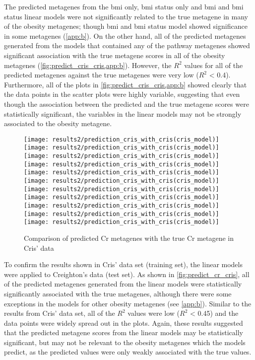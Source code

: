 The predicted metagenes from the \gls{bmi} only, \gls{bmi} status only and \gls{bmi} and \gls{bmi} status linear models were not significantly related to the true metagene in many of the obesity metagenes; though \gls{bmi} and \gls{bmi} status model showed significance in some metagenes (\cref{app:b}).
On the other hand, all of the predicted metagenes generated from the models that contained any of the pathway metagenes showed significant association with the true metagene scores in all of the obesity metagenes (\cref{fig:predict_cris_cris,app:b}).
However, the $R^2$ values for all of the predicted metagenes against the true metagenes were very low ($R^2$ \textless{} 0.4).
Furthermore, all of the plots in \cref{fig:predict_cris_cris,app:b} showed clearly that the data points in the scatter plots were highly variable, suggesting that even though the association between the predicted and the true metagene scores were statistically significant, the variables in the linear models may not be strongly associated to the obesity metagene.

\begin{figure}[htpb]
	\centering
	\texttt{[image: results2/prediction\_cris\_with\_cris(cris\_model)]}
	\texttt{[image: results2/prediction\_cris\_with\_cris(cris\_model)]}
	\texttt{[image: results2/prediction\_cris\_with\_cris(cris\_model)]}
	\texttt{[image: results2/prediction\_cris\_with\_cris(cris\_model)]}
	\texttt{[image: results2/prediction\_cris\_with\_cris(cris\_model)]}
	\texttt{[image: results2/prediction\_cris\_with\_cris(cris\_model)]}
	\texttt{[image: results2/prediction\_cris\_with\_cris(cris\_model)]}
	\texttt{[image: results2/prediction\_cris\_with\_cris(cris\_model)]}
	\texttt{[image: results2/prediction\_cris\_with\_cris(cris\_model)]}
	\texttt{[image: results2/prediction\_cris\_with\_cris(cris\_model)]}
	\texttt{[image: results2/prediction\_cris\_with\_cris(cris\_model)]}
	\caption{Comparison of predicted Cr metagenes with the true Cr metagene in Cris' data}
	\label{fig:predict_cris_cris}
\end{figure}

To confirm the results shown in Cris' data set (training set), the linear models were applied to Creighton's data (test set).
As shown in \cref{fig:predict_cr_cris}, all of the predicted metagenes generated from the linear models were statistically significantly associated with the true metagenes, although there were some exceptions in the models for other obesity metagenes (see \cref{app:b}).
Similar to the results from Cris' data set, all of the $R^2$ values were low ($R^2$ \textless{} 0.45) and the data points were widely spread out in the plots.
Again, these results suggested that the predicted metagene scores from the linear models may be statistically significant, but may not be relevant to the obesity metagenes which the models predict, as the predicted values were only weakly associated with the true values.
\\

